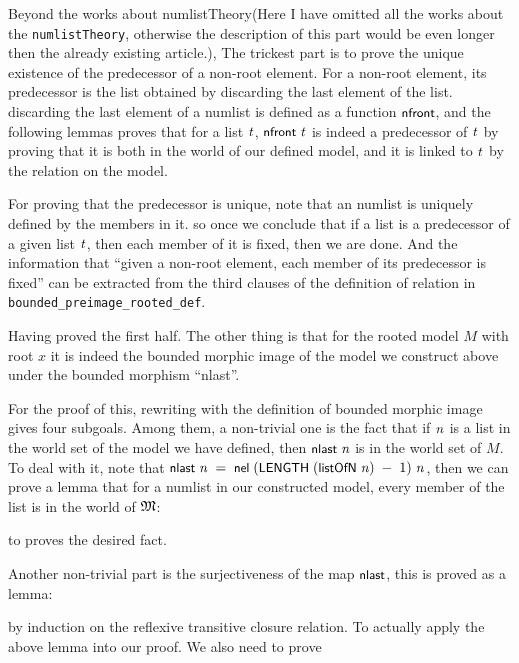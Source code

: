 \documentclass[letterpaper]{article}
\renewcommand{\HOLConst}[1]{{\textsf{\upshape\small #1}}}
\renewcommand{\HOLinline}[1]{\ensuremath{#1}}
\begin{document}
Beyond the works about numlistTheory(Here I have omitted all the works about the \texttt{numlistTheory}, otherwise the description of this part would be even longer then the already existing article.), The trickest part is to prove the unique existence of the predecessor of a non-root element. For a non-root element, its predecessor is the list obtained by discarding the last element of the list. discarding the last element of a numlist is defined as a function \HOLinline{\HOLConst{nfront}}, and the following lemmas proves that for a list \HOLinline{\HOLFreeVar{t}}, \HOLinline{\HOLConst{nfront}\;\HOLFreeVar{t}} is indeed a predecessor of \HOLinline{\HOLFreeVar{t}} by proving that it is both in the world of our defined model, and it is linked to \HOLinline{\HOLFreeVar{t}} by the relation on the model.

For proving that the predecessor is unique, note that an numlist is uniquely defined by the members in it. so once we conclude that if a list is a predecessor of a given list \HOLinline{\HOLFreeVar{t}}, then each member of it is fixed, then we are done. And the information that ``given a non-root element, each member of its predecessor is fixed'' can be extracted from the third clauses of the definition of relation in \texttt{bounded_preimage_rooted_def}.

Having proved the first half. The other thing is that for the rooted model $M$ with root $x$ it is indeed the bounded morphic image of the model we construct above under the bounded morphism ``nlast''.

For the proof of this, rewriting with the definition of bounded morphic image gives four subgoals. Among them, a non-trivial one is the fact that if \HOLinline{\HOLFreeVar{n}} is a list in the world set of the model we have defined, then \HOLinline{\HOLConst{nlast}\;\HOLFreeVar{n}} is in the world set of $M$. To deal with it, note that \HOLinline{\HOLConst{nlast}\;\HOLFreeVar{n}\;\HOLSymConst{=}\;\HOLConst{nel}\;(\HOLConst{LENGTH}\;(\HOLConst{listOfN}\;\HOLFreeVar{n})\;\HOLSymConst{\ensuremath{-}}\;\HOLNumLit{1})\;\HOLFreeVar{n}}, then we can prove a lemma that for a numlist in our constructed model, every member of the list is in the world of \HOLinline{\HOLFreeVar{\ensuremath{\mathfrak{M}}}}:

to proves the desired fact.

Another non-trivial part is the surjectiveness of the map \HOLinline{\HOLConst{nlast}}, this is proved as a lemma:

by induction on the reflexive transitive closure relation. To actually apply the above lemma into our proof. We also need to prove
\end{document}
